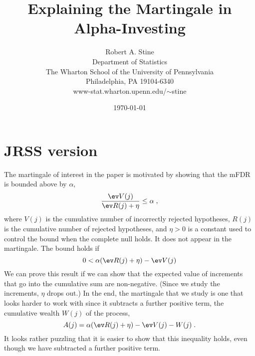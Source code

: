 \documentclass[12pt]{article}
\title{ Explaining the Martingale in Alpha-Investing }
\author{
        Robert A. Stine                     \\
        Department of Statistics            \\
        The Wharton School of the University of Pennsylvania \\
        Philadelphia, PA 19104-6340                          \\
        www-stat.wharton.upenn.edu/$\sim$stine 
}
\date{\today}
\begin{document}
\maketitle 


\section*{ JRSS version }

 The martingale of interest in the paper is motivated by showing that the mFDR is
 bounded above by $\alpha$,
 \begin{equation}
   \frac{\ev V(j)}{\ev R(j)+\eta} \le \alpha \;,    
 \label{eq:bound}
 \end{equation}
 where $V(j)$ is the cumulative number of incorrectly rejected hypotheses,
 $R(j)$ is the cumulative number of rejected hypotheses, and $\eta > 0$ is a
 constant used to control the bound when the complete null holds.  It does not
 appear in the martingale.  The bound  holds if
 \begin{equation}
    0 < \alpha(\ev R(j)+\eta) - \ev V(j)   
 \label{eq:bound2}
 \end{equation}
 We can prove this result if we can show that the expected value of increments
 that go into the cumulative sum are non-negative. (Since we study the
 increments, $\eta$ drops out.) In the end, the martingale that we study is one
 that looks harder to work with since it subtracts a further positive term, the
 cumulative wealth $W(j)$ of the process,
 \begin{displaymath}
      A(j) = \alpha(\ev R(j)+\eta) - \ev V(j) - W(j) \;.
 \end{displaymath}
 It looks rather puzzling that it is easier to show that this inequality holds,
 even though we have subtracted a further positive term.
\end{document}
